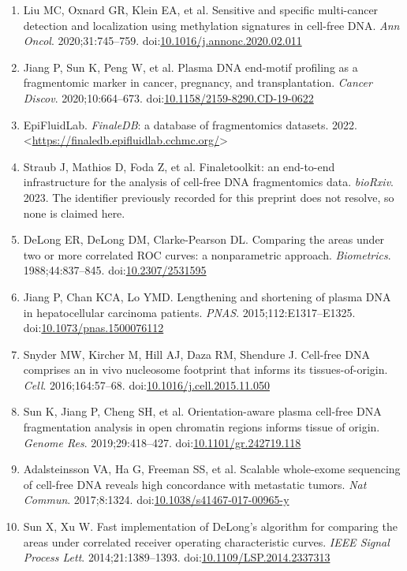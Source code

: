 \documentclass[11pt]{article}
\begin{document}
\begin{enumerate}
\item
Liu MC, Oxnard GR, Klein EA, et al. Sensitive and specific multi-cancer detection and localization using methylation signatures in cell-free DNA. \textit{Ann Oncol}. 2020;31:745--759. doi:\href{https://doi.org/10.1016/j.annonc.2020.02.011}{10.1016/\allowbreak{}j.annonc.2020.02.011}
\item
Jiang P, Sun K, Peng W, et al. Plasma DNA end-motif profiling as a fragmentomic marker in cancer, pregnancy, and transplantation. \textit{Cancer Discov}. 2020;10:664--673. doi:\href{https://doi.org/10.1158/2159-8290.CD-19-0622}{10.1158/\allowbreak{}2159-8290.CD-19-0622}
\item
EpiFluidLab. \textit{FinaleDB}: a database of fragmentomics datasets. 2022. \textless{}\url{https://finaledb.epifluidlab.cchmc.org/}\textgreater{}
\item
Straub J, Mathios D, Foda Z, et al. Finaletoolkit: an end-to-end infrastructure for the analysis of cell-free DNA fragmentomics data. \textit{bioRxiv}. 2023. The identifier previously recorded for this preprint does not resolve, so none is claimed here.
\item
DeLong ER, DeLong DM, Clarke-Pearson DL. Comparing the areas under two or more correlated ROC curves: a nonparametric approach. \textit{Biometrics}. 1988;44:837--845. doi:\href{https://doi.org/10.2307/2531595}{10.2307/\allowbreak{}2531595}
\item
Jiang P, Chan KCA, Lo YMD. Lengthening and shortening of plasma DNA in hepatocellular carcinoma patients. \textit{PNAS}. 2015;112:E1317--E1325. doi:\href{https://doi.org/10.1073/pnas.1500076112}{10.1073/\allowbreak{}pnas.1500076112}
\item
Snyder MW, Kircher M, Hill AJ, Daza RM, Shendure J. Cell-free DNA comprises an in vivo nucleosome footprint that informs its tissues-of-origin. \textit{Cell}. 2016;164:57--68. doi:\href{https://doi.org/10.1016/j.cell.2015.11.050}{10.1016/\allowbreak{}j.cell.2015.11.050}
\item
Sun K, Jiang P, Cheng SH, et al. Orientation-aware plasma cell-free DNA fragmentation analysis in open chromatin regions informs tissue of origin. \textit{Genome Res}. 2019;29:418--427. doi:\href{https://doi.org/10.1101/gr.242719.118}{10.1101/\allowbreak{}gr.242719.118}
\item
Adalsteinsson VA, Ha G, Freeman SS, et al. Scalable whole-exome sequencing of cell-free DNA reveals high concordance with metastatic tumors. \textit{Nat Commun}. 2017;8:1324. doi:\href{https://doi.org/10.1038/s41467-017-00965-y}{10.1038/\allowbreak{}s41467-017-00965-y}
\item
Sun X, Xu W. Fast implementation of DeLong's algorithm for comparing the areas under correlated receiver operating characteristic curves. \textit{IEEE Signal Process Lett}. 2014;21:1389--1393. doi:\href{https://doi.org/10.1109/LSP.2014.2337313}{10.1109/\allowbreak{}LSP.2014.2337313}
\end{enumerate}
\end{document}
